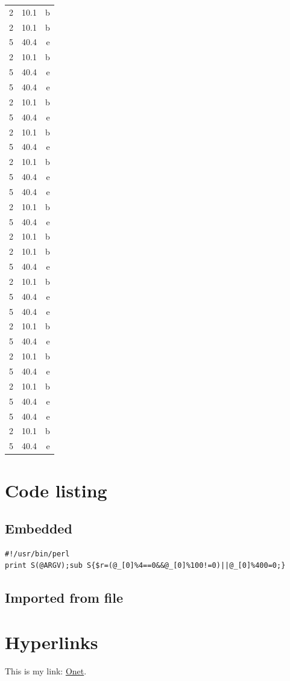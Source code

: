 \documentclass{article}
\begin{document}
\begin{longtable}[c]{l|S|r}
	2 & 10.1 & b \\ 
	2 & 10.1 & b \\ 
	5 & 40.4 & e \\ 
	2 & 10.1 & b \\ 
	5 & 40.4 & e \\ 
	5 & 40.4 & e \\ 
	2 & 10.1 & b \\ 
	5 & 40.4 & e \\ 
	2 & 10.1 & b \\ 
	5 & 40.4 & e \\ 
	2 & 10.1 & b \\ 
	5 & 40.4 & e \\ 
	5 & 40.4 & e \\ 
	2 & 10.1 & b \\ 
	5 & 40.4 & e \\ 
	2 & 10.1 & b \\ 
	2 & 10.1 & b \\ 
	5 & 40.4 & e \\ 
	2 & 10.1 & b \\ 
	5 & 40.4 & e \\ 
	5 & 40.4 & e \\ 
	2 & 10.1 & b \\ 
	5 & 40.4 & e \\ 
	2 & 10.1 & b \\ 
	5 & 40.4 & e \\ 
	2 & 10.1 & b \\ 
	5 & 40.4 & e \\ 
	5 & 40.4 & e \\ 
	2 & 10.1 & b \\ 
	5 & 40.4 & e \\ 
	\bottomrule
    \end{longtable}

    \newpage

    \section{Code listing}
    \subsection{Embedded}

    \begin{lstlisting}
#!/usr/bin/perl
print S(@ARGV);sub S{$r=(@_[0]%4==0&&@_[0]%100!=0)||@_[0]%400=0;}
    \end{lstlisting}

    \subsection{Imported from file}

    

    \newpage

    \section{Hyperlinks}

    This is my link: \href{http://www.onet.pl}{Onet}.

    \newpage
    
    \begin{appendix}
	\listoffigures
	\listoftables
    \end{appendix}
\end{document}

